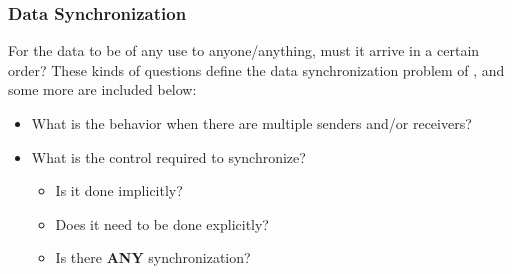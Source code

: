 \subsubsection{Data Synchronization}\label{subsubsec:IPC_Challenge-Data_Sync}
For the data to be of any use to anyone/anything, must it arrive in a certain order?
These kinds of questions define the data synchronization problem of , and some more are included below:
\begin{itemize}[noitemsep]
\item What is the behavior when there are multiple senders and/or receivers?
\item What is the control required to synchronize?
  \begin{itemize}[noitemsep]
  \item Is it done implicitly?
  \item Does it need to be done explicitly?
  \item Is there \textbf{ANY} synchronization?
  \end{itemize}
\end{itemize}

